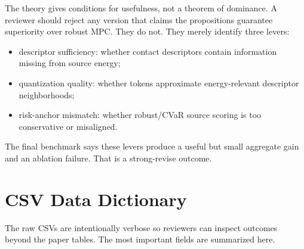 \documentclass{article}
\begin{document}
The theory gives conditions for usefulness, not a theorem of dominance. A reviewer should reject any version that claims the propositions guarantee superiority over robust MPC. They do not. They merely identify three levers:

\begin{itemize}
\item descriptor sufficiency: whether contact descriptors contain information missing from source energy;
\item quantization quality: whether tokens approximate energy-relevant descriptor neighborhoods;
\item risk-anchor mismatch: whether robust/CVaR source scoring is too conservative or misaligned.
\end{itemize}

The final benchmark says these levers produce a useful but small aggregate gain and an ablation failure. That is a strong-revise outcome.

\section{CSV Data Dictionary}

The raw CSVs are intentionally verbose so reviewers can inspect outcomes beyond the paper tables. The most important fields are summarized here.
\end{document}
